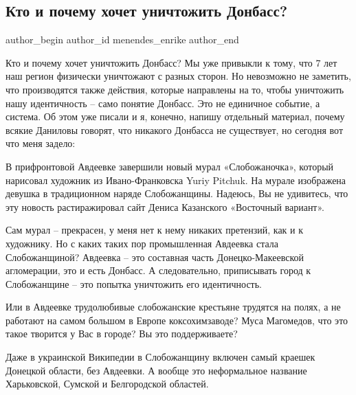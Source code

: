  
 
 
 
 
 
\subsection{Кто и почему хочет уничтожить Донбасс?}
\label{sec:13_10_2021.fb.menendes_enrike.1.donbass_identichnost}
 
\ifcmt
 author_begin
   author_id menendes_enrike
 author_end
\fi

Кто и почему хочет уничтожить Донбасс? Мы уже привыкли к тому, что 7 лет наш
регион физически уничтожают с разных сторон. Но невозможно не заметить, что
производятся также действия, которые направлены на то, чтобы уничтожить нашу
идентичность – само понятие Донбасс. Это не единичное событие, а система. Об
этом уже писали и я, конечно, напишу отдельный материал, почему всякие Даниловы
говорят, что никакого Донбасса не существует, но сегодня вот что меня задело:

В прифронтовой Авдеевке завершили новый мурал «Слобожаночка», который нарисовал
художник из Ивано-Франковска Yuriy Pitchuk. На мурале изображена девушка в
традиционном наряде Слобожанщины. Надеюсь, Вы не удивитесь, что эту новость
растиражировал сайт Дениса Казанского «Восточный вариант».

Сам мурал – прекрасен, у меня нет к нему никаких претензий, как и к художнику.
Но с каких таких пор промышленная Авдеевка стала Слобожанщиной? Авдеевка – это
составная часть Донецко-Макеевской агломерации, это и есть Донбасс. А
следовательно, приписывать город к Слобожанщине – это попытка уничтожить его
идентичность.

Или в Авдеевке трудолюбивые слобожанские крестьяне трудятся на полях, а не
работают на самом большом в Европе коксохимзаводе? Муса Магомедов, что это
такое творится у Вас в городе? Вы это поддерживаете?

Даже в украинской Википедии в Слобожанщину включен самый краешек Донецкой
области, без Авдеевки. А вообще это неформальное название Харьковской, Сумской
и Белгородской областей.

